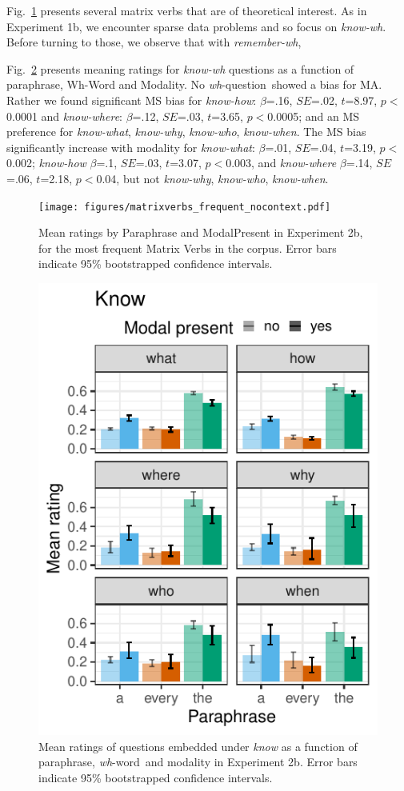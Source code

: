 \documentclass[12pt,letterpaper,table,svgnames,dvipsnames]{article}
\newcommand{\figref}[1]{Fig.~\ref{#1}}
\newcommand{\whq}{\emph{wh}-question~}
\newcommand{\whw}{\emph{wh}-word~}
\begin{document}
\figref{ex2b_matrix_verbs} presents several matrix verbs that are of theoretical interest. As in Experiment 1b, we encounter sparse data problems and so focus on \emph{know-wh}. Before turning to those, we observe that with \emph{remember-wh}, 

\figref{ex2b_know_modXwh} presents meaning ratings for \emph{know-wh} questions as a function of paraphrase, Wh-Word and Modality. No \whq showed a bias for MA. Rather we found significant MS bias for \emph{know-how}: $\beta$=.16, $SE$=.02, $t$=8.97, $p<$0.0001 and \emph{know-where}: $\beta$=.12, $SE$=.03, $t$=3.65, $p<$0.0005; and an MS preference for \emph{know-what}, \emph{know-why}, \emph{know-who}, \emph{know-when}. The MS bias significantly increase with modality for \emph{know-what}: $\beta$=.01, $SE$=.04, $t$=3.19, $p<$0.002; \emph{know-how} $\beta$=.1, $SE$=.03, $t$=3.07, $p<$0.003, and \emph{know-where} $\beta$=.14, $SE$=.06, $t$=2.18, $p<$0.04, but not \emph{know-why}, \emph{know-who}, \emph{know-when}.

\begin{figure}[h!]
\centering
\texttt{[image: figures/matrixverbs\_frequent\_nocontext.pdf]}
\caption{Mean ratings by Paraphrase and ModalPresent in Experiment 2b, for the most frequent  Matrix Verbs in the corpus. Error bars indicate 95\% bootstrapped confidence intervals.} 
\label{ex2b_matrix_verbs}
\end{figure}


\begin{figure}[h!]
\centering
\includegraphics[scale=1]{figures/modwh_know_nocontext.pdf}
\caption{Mean ratings of questions embedded under \emph{know} as a function of paraphrase, \whw and modality in Experiment 2b. Error bars indicate 95\% bootstrapped confidence intervals.} 
\label{ex2b_know_modXwh}
\end{figure}
\end{document}
